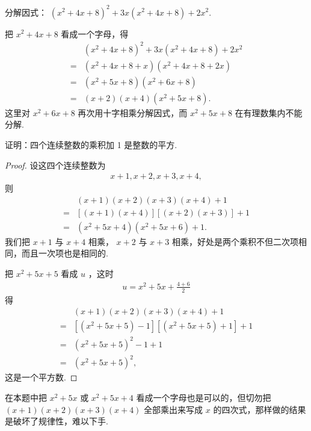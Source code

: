 \begin{example}
	分解因式： $\left(x^{2}+4 x+8\right)^{2}+3 x\left(x^{2}+4 x+8\right)+2 x^{2}$.
\end{example}
\begin{solution}
	把 $x^{2}+4 x+8$ 看成一个字母，得
	\begin{align*}
		  & \left(x^{2}+4 x+8\right)^{2}+3 x\left(x^{2}+4 x+8\right)+2 x^{2} \\
		= & \left(x^{2}+4 x+8+x\right)\left(x^{2}+4 x+8+2 x\right)           \\
		= & \left(x^{2}+5 x+8\right)\left(x^{2}+6 x+8\right)                 \\
		= & (x+2)(x+4)\left(x^{2}+5 x+8\right) .
	\end{align*}
	这里对 $x^{2}+6 x+8$ 再次用十字相乘分解因式，而 $x^{2}+5 x+8$ 在有理数集内不能分解.
\end{solution}

\begin{example}
	证明：四个连续整数的乘积加 1 是整数的平方.
\end{example}
\begin{proof}
	设这四个连续整数为
	\begin{align*}
		x+1, x+2, x+3, x+4,
	\end{align*}
	则
	\begin{align*}
		  & (x+1)(x+2)(x+3)(x+4)+1                               \\
		= & {[(x+1)(x+4)][(x+2)(x+3)]+1 }                        \\
		= & \left(x^{2}+5 x+4\right)\left(x^{2}+5 x+6\right)+1 .
	\end{align*}
	我们把 $x+1$ 与 $x+4$ 相乘， $x+2$ 与 $x+3$ 相乘，好处是两个乘积不但二次项相同，而且一次项也是相同的.

	把 $x^{2}+5 x+5$ 看成 $u$ ，这时
	\begin{align*}
		u=x^{2}+5 x+\frac{4+6}{2}
	\end{align*}
	得
	\begin{align*}
		  & (x+1)(x+2)(x+3)(x+4)+1                                                              \\
		= & {\left[\left(x^{2}+5 x+5\right)-1\right]\left[\left(x^{2}+5 x+5\right)+1\right]+1 } \\
		= & \left(x^{2}+5 x+5\right)^{2}-1+1                                                    \\
		= & \left(x^{2}+5 x+5\right)^{2},
	\end{align*}
	这是一个平方数.
\end{proof}
\begin{note}
	在本题中把 $x^{2}+5 x$ 或 $x^{2}+5 x+4$ 看成一个字母也是可以的，但切勿把 $(x+1)(x+2)(x+3)(x+4)$ 全部乘出来写成 $x$ 的四次式，那样做的结果是破坏了规律性，难以下手.
\end{note}

